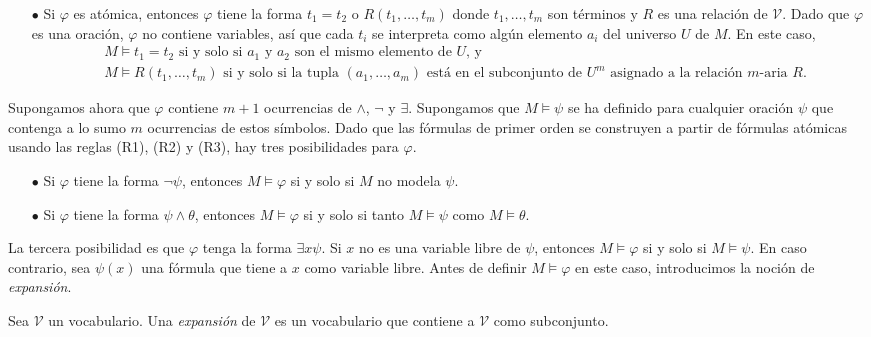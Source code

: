 \documentclass[12pt,a4paper]{book}
\newcommand{\VV}{\mathcal{V}}
\begin{document}
    \begin{itemize}
        \item[$\bullet$] Si $\varphi$ es atómica, entonces $\varphi$ tiene la forma $t_{1}=t_{2}$ o $R(t_{1},\dots,t_{m})$
        donde $t_{1},\dots,t_{m}$ son términos y $R$ es una relación de $\VV$. Dado que $\varphi$ es una oración,
        $\varphi$ no contiene variables, así que cada $t_{i}$ se interpreta como algún elemento $a_{i}$ del universo $U$ de
        $M$. En este caso,
        \begin{align*}
            &M\models t_{1}=t_{2}\text{ si y solo si $a_{1}$ y $a_{2}$ son el mismo elemento de $U$, y}\\
            &M\models R(t_{1},\dots,t_{m})\text{ si y solo si la tupla $(a_{1},\dots,a_{m})$ está en el subconjunto de
            $U^{m}$ asignado a la relación $m$-aria $R$.}
        \end{align*}
    \end{itemize}

    Supongamos ahora que $\varphi$ contiene $m+1$ ocurrencias de $\wedge$, $\neg$ y $\exists$. Supongamos que $M\models\psi$
    se ha definido para cualquier oración $\psi$ que contenga a lo sumo $m$ ocurrencias de estos símbolos. Dado que las
    fórmulas de primer orden se construyen a partir de fórmulas atómicas usando las reglas (R1), (R2) y (R3), hay tres
    posibilidades para $\varphi$.

    \begin{itemize}
        \item[$\bullet$] Si $\varphi$ tiene la forma $\neg\psi$, entonces $M\models\varphi$ si y solo si $M$ no modela $\psi$.
        \item[$\bullet$] Si $\varphi$ tiene la forma $\psi\wedge\theta$, entonces $M\models\varphi$ si y solo si tanto
        $M\models\psi$ como $M\models\theta$.
    \end{itemize}

    La tercera posibilidad es que $\varphi$ tenga la forma $\exists x\psi$. Si $x$ no es una variable libre de $\psi$,
    entonces $M\models\varphi$ si y solo si $M\models\psi$. En caso contrario, sea $\psi(x)$ una fórmula que tiene a $x$
    como variable libre. Antes de definir $M\models\varphi$ en este caso, introducimos la noción de \textit{expansión}.

    \begin{definicion}[Expansión]\label{def:expansion-vocabulario}
        Sea $\VV$ un vocabulario. Una \textit{expansión} de $\VV$ es un vocabulario que contiene a $\VV$ como subconjunto.
    \end{definicion}
\end{document}
